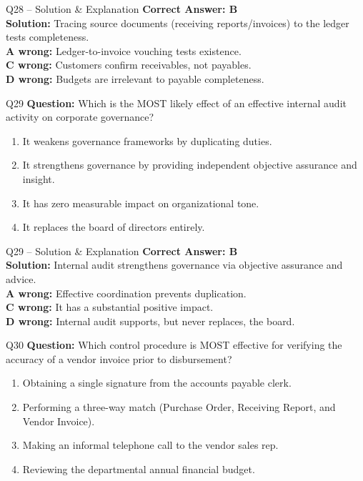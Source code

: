 \documentclass[aspectratio=169,10pt]{beamer}
\begin{document}
	\begin{frame}[t]{Q28 -- Solution \& Explanation}
		\small
		\textbf{Correct Answer: B} \\[4pt]
		\textbf{Solution:} Tracing source documents (receiving reports/invoices) to the ledger tests completeness. \\[4pt]
		\textbf{A wrong:} Ledger-to-invoice vouching tests existence. \\[2pt]
		\textbf{C wrong:} Customers confirm receivables, not payables. \\[2pt]
		\textbf{D wrong:} Budgets are irrelevant to payable completeness.
	\end{frame}
	
	\begin{frame}[t]{Q29}
		\small
		\textbf{Question:} Which is the MOST likely effect of an effective internal audit activity on corporate governance?
		\begin{enumerate}[label=\Alph*.,itemsep=1pt,topsep=2pt]
			\item It weakens governance frameworks by duplicating duties.
			\item It strengthens governance by providing independent objective assurance and insight.
			\item It has zero measurable impact on organizational tone.
			\item It replaces the board of directors entirely.
		\end{enumerate}
	\end{frame}
	
	\begin{frame}[t]{Q29 -- Solution \& Explanation}
		\small
		\textbf{Correct Answer: B} \\[4pt]
		\textbf{Solution:} Internal audit strengthens governance via objective assurance and advice. \\[4pt]
		\textbf{A wrong:} Effective coordination prevents duplication. \\[2pt]
		\textbf{C wrong:} It has a substantial positive impact. \\[2pt]
		\textbf{D wrong:} Internal audit supports, but never replaces, the board.
	\end{frame}
	
	\begin{frame}[t]{Q30}
		\small
		\textbf{Question:} Which control procedure is MOST effective for verifying the accuracy of a vendor invoice prior to disbursement?
		\begin{enumerate}[label=\Alph*.,itemsep=1pt,topsep=2pt]
			\item Obtaining a single signature from the accounts payable clerk.
			\item Performing a three-way match (Purchase Order, Receiving Report, and Vendor Invoice).
			\item Making an informal telephone call to the vendor sales rep.
			\item Reviewing the departmental annual financial budget.
		\end{enumerate}
	\end{frame}
	
\end{document}
